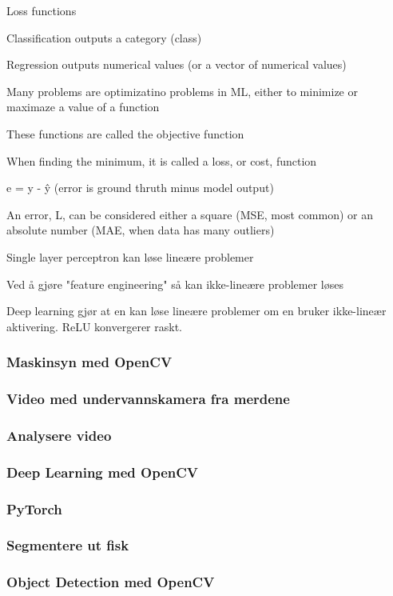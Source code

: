 Loss functions

	Classification outputs a category (class)

	Regression outputs numerical values (or a vector of numerical values)

	Many problems are optimizatino problems in ML, either to minimize or maximaze a value of a function

	These functions are called the objective function

	When finding the minimum, it is called a loss, or cost, function

	e = y - \^y (error is ground thruth minus model output)

	An error, L, can be considered either a square (MSE, most common) or an absolute number (MAE, when data has many outliers)

Single layer perceptron kan løse lineære problemer

Ved å gjøre "feature engineering" så kan ikke-lineære problemer løses

Deep learning gjør at en kan løse lineære problemer om en bruker ikke-lineær aktivering. ReLU konvergerer raskt.

\subsubsection{Maskinsyn med OpenCV}
\subsubsection{Video med undervannskamera fra merdene}
\subsubsection{Analysere video}
\subsubsection{Deep Learning med OpenCV}
\subsubsection{PyTorch}
\subsubsection{Segmentere ut fisk}
\subsubsection{Object Detection med OpenCV}
